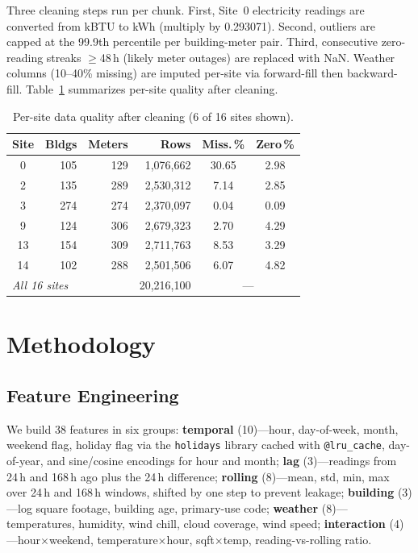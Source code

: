 \documentclass[conference]{IEEEtran}
\begin{document}
Three cleaning steps run per chunk. First, Site~0 electricity readings are converted from kBTU to kWh (multiply by 0.293071). Second, outliers are capped at the 99.9th percentile per building-meter pair. Third, consecutive zero-reading streaks $\geq$48\,h (likely meter outages) are replaced with NaN. Weather columns (10--40\% missing) are imputed per-site via forward-fill then backward-fill. Table~\ref{tab:data_quality} summarizes per-site quality after cleaning.

\begin{table}[t]
\centering
\caption{Per-site data quality after cleaning (6 of 16 sites shown).}
\label{tab:data_quality}
\scriptsize
\begin{tabular}{@{}crrrcc@{}}
\toprule
\textbf{Site} & \textbf{Bldgs} & \textbf{Meters} & \textbf{Rows} & \textbf{Miss.\,\%} & \textbf{Zero\,\%} \\
\midrule
0  & 105 & 129 & 1,076,662 & 30.65 & 2.98 \\
2  & 135 & 289 & 2,530,312 & 7.14  & 2.85 \\
3  & 274 & 274 & 2,370,097 & 0.04  & 0.09 \\
9  & 124 & 306 & 2,679,323 & 2.70  & 4.29 \\
13 & 154 & 309 & 2,711,763 & 8.53  & 3.29 \\
14 & 102 & 288 & 2,501,506 & 6.07  & 4.82 \\
\midrule
\multicolumn{3}{l}{\textit{All 16 sites}} & 20,216,100 & \multicolumn{2}{c}{---} \\
\bottomrule
\end{tabular}
\end{table}

\section{Methodology}

\subsection{Feature Engineering}

We build 38 features in six groups: \textbf{temporal} (10)---hour, day-of-week, month, weekend flag, holiday flag via the \texttt{holidays} library cached with \texttt{@lru\_cache}, day-of-year, and sine/cosine encodings for hour and month; \textbf{lag} (3)---readings from 24\,h and 168\,h ago plus the 24\,h difference; \textbf{rolling} (8)---mean, std, min, max over 24\,h and 168\,h windows, shifted by one step to prevent leakage; \textbf{building} (3)---log square footage, building age, primary-use code; \textbf{weather} (8)---temperatures, humidity, wind chill, cloud coverage, wind speed; \textbf{interaction} (4)---hour$\times$weekend, temperature$\times$hour, sqft$\times$temp, reading-vs-rolling ratio.
\end{document}
